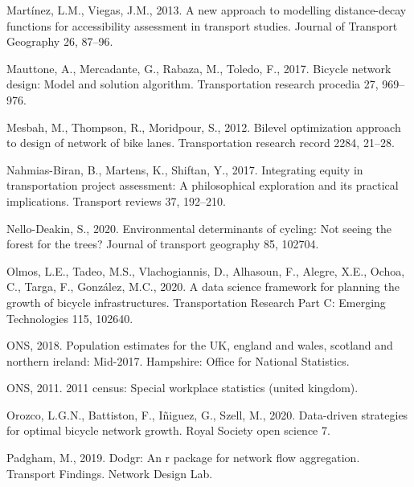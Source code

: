 \documentclass[
]{article}
\newlength{\cslhangindent}
\newlength{\cslentryspacingunit} %
\newenvironment{CSLReferences}[2] %
 {%
  \setlength{\parindent}{0pt}
  \ifodd #1
  \let\oldpar\par
  \def\par{\hangindent=\cslhangindent\oldpar}
  \fi
  \setlength{\parskip}{#2\cslentryspacingunit}
 }%
 {}
\begin{document}
\begin{CSLReferences}{1}{0}
\leavevmode{}%
Martínez, L.M., Viegas, J.M., 2013. A new approach to modelling distance-decay functions for accessibility assessment in transport studies. Journal of Transport Geography 26, 87--96.

\leavevmode{}%
Mauttone, A., Mercadante, G., Rabaza, M., Toledo, F., 2017. Bicycle network design: Model and solution algorithm. Transportation research procedia 27, 969--976.

\leavevmode{}%
Mesbah, M., Thompson, R., Moridpour, S., 2012. Bilevel optimization approach to design of network of bike lanes. Transportation research record 2284, 21--28.

\leavevmode{}%
Nahmias-Biran, B., Martens, K., Shiftan, Y., 2017. Integrating equity in transportation project assessment: A philosophical exploration and its practical implications. Transport reviews 37, 192--210.

\leavevmode{}%
Nello-Deakin, S., 2020. Environmental determinants of cycling: Not seeing the forest for the trees? Journal of transport geography 85, 102704.

\leavevmode{}%
Olmos, L.E., Tadeo, M.S., Vlachogiannis, D., Alhasoun, F., Alegre, X.E., Ochoa, C., Targa, F., González, M.C., 2020. A data science framework for planning the growth of bicycle infrastructures. Transportation Research Part C: Emerging Technologies 115, 102640.

\leavevmode{}%
ONS, 2018. Population estimates for the UK, england and wales, scotland and northern ireland: Mid-2017. Hampshire: Office for National Statistics.

\leavevmode{}%
ONS, 2011. 2011 census: Special workplace statistics (united kingdom).

\leavevmode{}%
Orozco, L.G.N., Battiston, F., Iñiguez, G., Szell, M., 2020. Data-driven strategies for optimal bicycle network growth. Royal Society open science 7.

\leavevmode{}%
Padgham, M., 2019. Dodgr: An r package for network flow aggregation. Transport Findings. Network Design Lab.


\end{CSLReferences}
\end{document}
